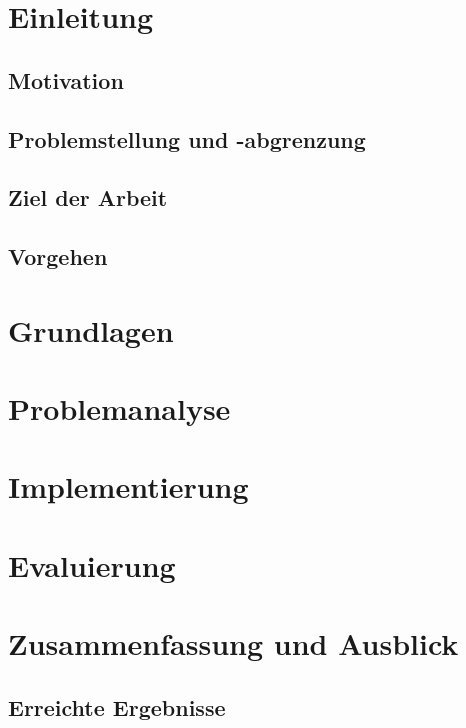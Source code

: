 \documentclass[oneside]{ausarbeitung}
\begin{document}
\chapter{Einleitung}
\label{cha:einleitung}

\section{Motivation}
\label{sec:motivation}

\section{Problemstellung und -abgrenzung}
\label{sec:problemstellung}

\section{Ziel der Arbeit}
\label{sec:ziel}


\section{Vorgehen}
\label{sec:vorgehen}


\chapter{Grundlagen}
\label{cha:grundlagen}
\chapter{Problemanalyse}
\label{cha:problemanalyse}


\chapter{Implementierung}
\label{cha:implementierung}



\chapter{Evaluierung}
\label{cha:evaluation}


\chapter{Zusammenfassung und Ausblick}
\label{cha:zusammenfassung}
\section{Erreichte Ergebnisse}
\label{sec:ergebnisse}
\end{document}
